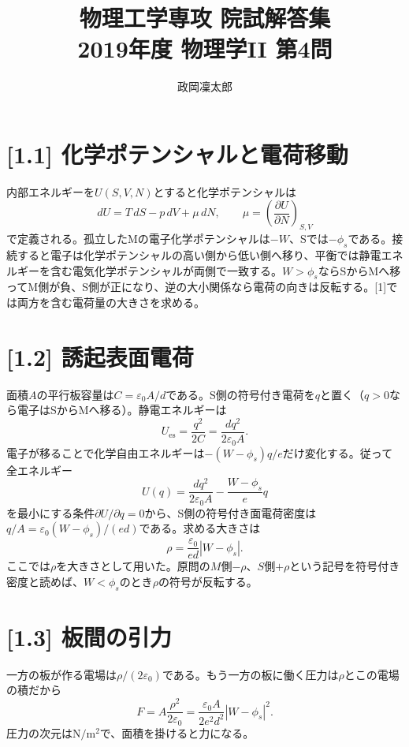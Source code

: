\documentclass[11pt,a4paper]{article}
\title{物理工学専攻 院試解答集\\2019年度 物理学II 第4問}
\author{政岡凜太郎}
\date{}
\begin{document}
\maketitle

\section*{[1.1] 化学ポテンシャルと電荷移動}
内部エネルギーを$U(S,V,N)$とすると化学ポテンシャルは
\begin{equation}
 dU=T\,dS-p\,dV+\mu\,dN,\qquad
 \mu=\left(\frac{\partial U}{\partial N}\right)_{S,V}
\end{equation}
で定義される。孤立したMの電子化学ポテンシャルは$-W$、Sでは$-\phi_s$である。接続すると電子は化学ポテンシャルの高い側から低い側へ移り、平衡では静電エネルギーを含む電気化学ポテンシャルが両側で一致する。$W>\phi_s$ならSからMへ移ってM側が負、S側が正になり、逆の大小関係なら電荷の向きは反転する。[1]では両方を含む電荷量の大きさを求める。

\section*{[1.2] 誘起表面電荷}
面積$A$の平行板容量は$C=\varepsilon_0A/d$である。S側の符号付き電荷を$q$と置く（$q>0$なら電子はSからMへ移る）。静電エネルギーは
\begin{equation}
 U_{\mathrm{es}}=\frac{q^2}{2C}=\frac{d q^2}{2\varepsilon_0A}.
\end{equation}
電子が移ることで化学自由エネルギーは$-(W-\phi_s)q/e$だけ変化する。従って全エネルギー
\begin{equation}
 U(q)=\frac{d q^2}{2\varepsilon_0A}
 -\frac{W-\phi_s}{e}q
\end{equation}
を最小にする条件$\partial U/\partial q=0$から、S側の符号付き面電荷密度は$q/A=\varepsilon_0(W-\phi_s)/(ed)$である。求める大きさは
\begin{equation}
 \boxed{\rho=\frac{\varepsilon_0}{ed}|W-\phi_s|}.
\end{equation}
ここでは$\rho$を大きさとして用いた。原問の$M$側$-\rho$、$S$側$+\rho$という記号を符号付き密度と読めば、$W<\phi_s$のとき$\rho$の符号が反転する。

\section*{[1.3] 板間の引力}
一方の板が作る電場は$\rho/(2\varepsilon_0)$である。もう一方の板に働く圧力は$\rho$とこの電場の積だから
\begin{equation}
 F=A\frac{\rho^2}{2\varepsilon_0}
 =\boxed{\frac{\varepsilon_0A}{2e^2d^2}|W-\phi_s|^2}.
\end{equation}
圧力の次元は$\mathrm{N/m^2}$で、面積を掛けると力になる。
\end{document}
